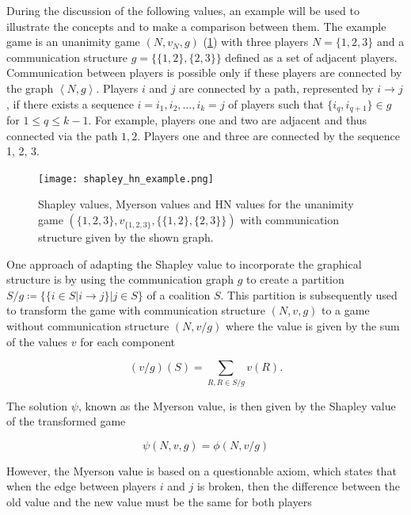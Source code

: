 During the discussion of the following values, an example will be used to illustrate 
the concepts and to make a comparison between them. 
The example game is an unanimity game $(N, v_N, g)$ (\cref{fig:shapley_hn_example}) 
with three players $N = \{1, 2, 3\}$ and a communication structure $g = \{\{1, 2\}, \{2, 3\}\}$ 
defined as a set of adjacent players.\cite{hamiache_associated_2020} Communication 
between players is possible only if these players are connected by the graph 
$\left<N, g\right>$. Players $i$ and $j$ are connected by a path, represented by $i \rightarrow j$, 
if there exists a sequence $i = i_1, i_2, \dots, i_k = j$ of players such 
that $\{i_q, i_{q+1}\} \in g$ for $1 \le q \le k - 1$. For example, 
players one and two are adjacent and thus connected via the path $1, 2$. 
Players one and three are connected by the sequence 1, 2, 3.\cite{hamiache_value_1999, hamiache_associated_2020} 


\begin{figure}[h]
    \centering
    \texttt{[image: shapley\_hn\_example.png]}
    \caption{Shapley values, Myerson values and HN values for the unanimity game $(\{1, 2, 3\}, v_{\{1, 2, 3\}}, \{\{1, 2\}, \{2, 3\}\})$ 
            with communication structure given by the shown graph.}
    \label{fig:shapley_hn_example}
\end{figure}


One approach of adapting the Shapley value to incorporate the graphical 
structure is by using the communication graph $g$ to create a partition 
$S/g \coloneqq \{\{ i \in S| i \rightarrow j\} | j \in S\}$ of a coalition 
$S$. This partition is subsequently used to transform the game with 
communication structure $(N, v, g)$ to a game without communication structure 
$(N, v/g)$ where the value is given by the sum of the values $v$ for each component\cite{hamiache_value_1999}


\begin{equation}
    (v/g)(S) = \sum_{R, R \in S/g} v(R). 
\end{equation}


The solution $\psi$, known as the Myerson value, is then given by the Shapley value of the 
transformed game\cite{hamiache_value_1999} 


\begin{equation}
    \psi(N, v, g) = \phi(N, v/g)
\end{equation}


However, the Myerson value is based on a questionable axiom, which states that 
when the edge between players $i$ and $j$ is broken, then the difference between 
the old value and the new value must be the same for both players 


